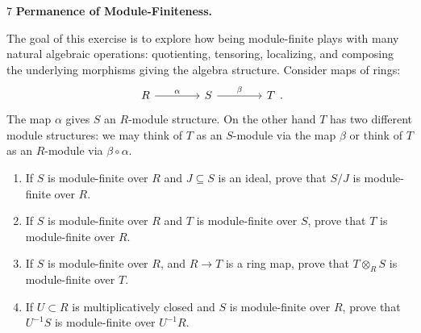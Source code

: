 \documentclass[Notebook.tex]{subfiles}
\begin{document}
\newpage

\begin{problem}{7}
    \textbf{Permanence of Module-Finiteness.} 
    
    The goal of this exercise is to explore how being module-finite plays with many natural algebraic operations: quotienting, tensoring, localizing, and composing the underlying morphisms giving the algebra structure. Consider maps of rings:
    \[
    \begin{tikzcd}[row sep = .3em, column sep = 4em]
    R \arrow[r, "\alpha"] & S \arrow[r, "\beta"] & T
    \end{tikzcd}.
    \]
    The map $\alpha$ gives $S$ an $R$-module structure. On the other hand $T$ has two different module structures: we may think of $T$ as an $S$-module via the map $\beta$ or think of $T$ as an $R$-module via $\beta\circ\alpha$. 
    \begin{enumerate}
        \item If $S$ is module-finite over $R$ and $J\subseteq S$ is an ideal, prove that $S/J$ is module-finite over $R$.
        \item If $S$ is module-finite over $R$ and $T$ is module-finite over $S$, prove that $T$ is module-finite over $R$.
        \item If $S$ is module-finite over $R$, and $R\to T$ is a ring map, prove that $T\otimes_R S$ is module-finite over $T$.
        \item If $U\subset R$ is multiplicatively closed and $S$ is module-finite over $R$, prove that $U^{-1}S$ is module-finite over $U^{-1}R$.
    \end{enumerate}
\end{problem}
\end{document}
